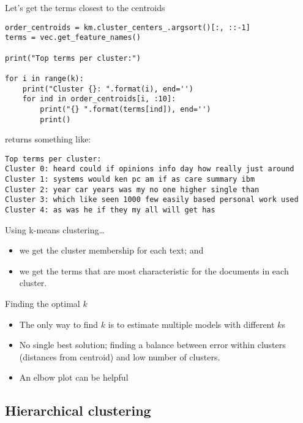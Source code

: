 \documentclass[compress]{beamer}
\begin{document}
\begin{frame}{Let's get the terms closest to the centroids}
\begin{lstlisting}
order_centroids = km.cluster_centers_.argsort()[:, ::-1]
terms = vec.get_feature_names()

print("Top terms per cluster:")

for i in range(k):
    print("Cluster {}: ".format(i), end='')
    for ind in order_centroids[i, :10]:
        print("{} ".format(terms[ind]), end='')
        print()
\end{lstlisting}
\pause
returns something like:

\begin{lstlisting}
Top terms per cluster:
Cluster 0: heard could if opinions info day how really just around 
Cluster 1: systems would ken pc am if as care summary ibm 
Cluster 2: year car years was my no one higher single than 
Cluster 3: which like seen 1000 few easily based personal work used 
Cluster 4: as was he if they my all will get has 
\end{lstlisting}
\end{frame}


\begin{frame}{Using k-means clustering\ldots}
\begin{itemize}
\item we get the cluster membership for each text; and
\item we get the terms that are most characteristic for the documents in each cluster.
\end{itemize}
\end{frame}

\begin{frame}{Finding the optimal $k$}

\begin{itemize}
\item The only way to find $k$ is to estimate multiple models with different $k$s
\item No single best solution; finding a balance between error within clusters (distances from centroid) and low number of clusters.
\item An elbow plot can be helpful 
\end{itemize}


\end{frame}


\subsection{Hierarchical clustering}
\end{document}
